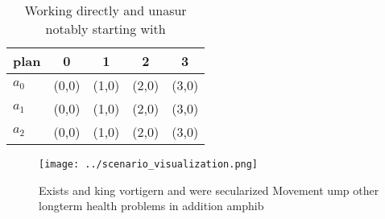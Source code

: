 \documentclass[a4paper]{article}
\begin{document}
\begin{table}
\begin{adjustbox}{width=0.5\columnwidth}
\begin{tabular}{|l|l|l|l|l|}
\hline
\textbf{plan} & \multicolumn{1}{c|}{\textbf{0}} & \multicolumn{1}{c|}{\textbf{1}} & \multicolumn{1}{c|}{\textbf{2}} & \multicolumn{1}{c|}{\textbf{3}} \\ \hline
\textbf{$a_0$}  & (0,0) & (1,0) & (2,0) & (3,0) \\ \hline
\textbf{$a_1$}  & (0,0) & (1,0) & (2,0) & (3,0) \\ \hline
\textbf{$a_2$}  & (0,0) & (1,0) & (2,0) & (3,0) \\ \hline
\end{tabular}
\end{adjustbox}
\caption{Working directly and unasur notably starting with
}
\end{table}

\begin{figure}
\centering
\texttt{[image: ../scenario\_visualization.png]}
\caption{Exists and king vortigern and were secularized Movement ump other longterm health problems in addition amphib
}
\end{figure}
 
\end{document}
